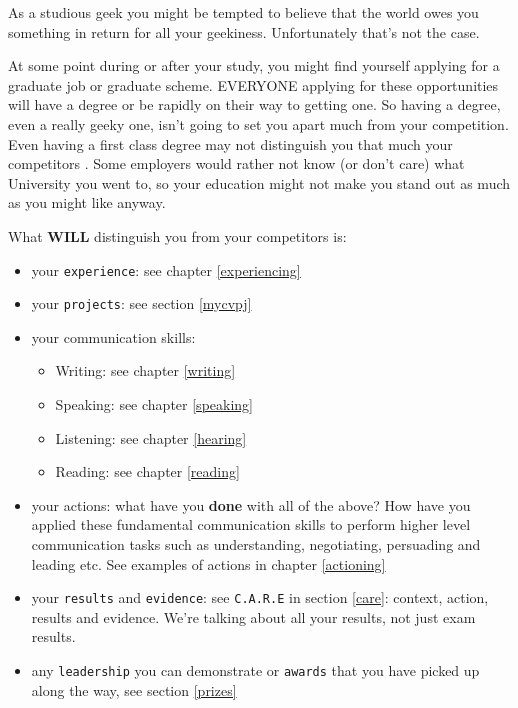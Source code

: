 \documentclass[
]{book}
\providecommand{\tightlist}{%
  \setlength{\itemsep}{0pt}\setlength{\parskip}{0pt}}
\begin{document}
As a studious geek you might be tempted to believe that the world owes you something in return for all your geekiness. Unfortunately that's not the case.

At some point during or after your study, you might find yourself applying for a graduate job or graduate scheme. EVERYONE applying for these opportunities will have a degree or be rapidly on their way to getting one. So having a degree, even a really geeky one, isn't going to set you apart much from your competition. Even having a first class degree may not distinguish you that much your competitors \citep{gradeinflation, firstclass}. Some employers would rather not know (or don't care) what University you went to, so your education might not make you stand out as much as you might like anyway. \citep{bigfour, eyfirm}

What \textbf{WILL} distinguish you from your competitors is:

\begin{itemize}
\tightlist
\item
  your \texttt{experience}: see chapter \ref{experiencing}
\item
  your \texttt{projects}: see section \ref{mycvpj}
\item
  your communication skills:

  \begin{itemize}
  \tightlist
  \item
    Writing: see chapter \ref{writing}
  \item
    Speaking: see chapter \ref{speaking}
  \item
    Listening: see chapter \ref{hearing}
  \item
    Reading: see chapter \ref{reading}
  \end{itemize}
\item
  your actions: what have you \textbf{done} with all of the above? How have you applied these fundamental communication skills to perform higher level communication tasks such as understanding, negotiating, persuading and leading etc. See examples of actions in chapter \ref{actioning}
\item
  your \texttt{results} and \texttt{evidence}: see \texttt{C.A.R.E} in section \ref{care}: context, action, results and evidence. We're talking about all your results, not just exam results.
\item
  any \texttt{leadership} you can demonstrate or \texttt{awards} that you have picked up along the way, see section \ref{prizes}
\end{itemize}
\end{document}
